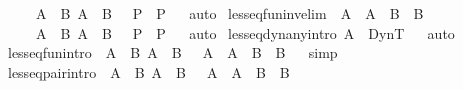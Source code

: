 \begin{isabellebody}
\ \ \ \ {\isasymlbrakk}\ A{}\ {\isasymsqsubseteq}\ B{}{\isacharsemicolon}\ A{}\ {\isasymsqsubseteq}\ B{}\ {\isasymrbrakk}\ {\isasymLongrightarrow}\ P{\isasymrbrakk}\ {\isasymLongrightarrow}\ P{\isachardoublequoteclose}\isadelimproof
\ \endisadelimproof
\isatagproof
{}\isamarkupfalse \ auto\endisatagproof
{\isafoldproof}\isadelimproof
\endisadelimproof
\isanewline
{}\isamarkupfalse \ lesseq{\isacharunderscore}fun{\isacharunderscore}inv{\isacharbrackleft}elim{\isacharbang}{\isacharbrackright}{\isacharcolon}\ {\isachardoublequoteopen}{\isasymlbrakk}\ {\isacharparenleft}A{}\ {\isasymrightarrow}\ A{}{\isacharparenright}\ {\isasymsqsubseteq}\ {\isacharparenleft}B{}\ {\isasymrightarrow}\ B{}{\isacharparenright}{\isacharsemicolon}\ \isanewline
\ \ \ \ {\isasymlbrakk}\ A{}\ {\isasymsqsubseteq}\ B{}{\isacharsemicolon}\ A{}\ {\isasymsqsubseteq}\ B{}\ {\isasymrbrakk}\ {\isasymLongrightarrow}\ P{\isasymrbrakk}\ {\isasymLongrightarrow}\ P{\isachardoublequoteclose}\isadelimproof
\ \endisadelimproof
\isatagproof
{}\isamarkupfalse \ auto\endisatagproof
{\isafoldproof}\isadelimproof
\endisadelimproof
\isanewline
\isanewline
{}\isamarkupfalse \ lesseq{\isacharunderscore}dyn{\isacharunderscore}any{\isacharbrackleft}intro{\isacharbang}{\isacharbrackright}{\isacharcolon}\ {\isachardoublequoteopen}A\ {\isasymsqsubseteq}\ DynT{\isachardoublequoteclose}\isadelimproof
\ \endisadelimproof
\isatagproof
{}\isamarkupfalse \ auto\endisatagproof
{\isafoldproof}\isadelimproof
\endisadelimproof
\isanewline
\isanewline
{}\isamarkupfalse \ less{\isacharunderscore}eq{\isacharunderscore}fun{\isacharbrackleft}intro{\isacharbang}{\isacharbrackright}{\isacharcolon}\ {\isachardoublequoteopen}{\isasymlbrakk}\ A{}\ {\isasymsqsubseteq}\ B{}{\isacharsemicolon}\ A{}\ {\isasymsqsubseteq}\ B{}\ {\isasymrbrakk}\ {\isasymLongrightarrow}\ A{}\ {\isasymrightarrow}\ A{}\ {\isasymsqsubseteq}\ B{}\ {\isasymrightarrow}\ B{}{\isachardoublequoteclose}\isadelimproof
\ \endisadelimproof
\isatagproof
{}\isamarkupfalse \ simp\endisatagproof
{\isafoldproof}\isadelimproof
\endisadelimproof
\isanewline
{}\isamarkupfalse \ less{\isacharunderscore}eq{\isacharunderscore}pair{\isacharbrackleft}intro{\isacharbang}{\isacharbrackright}{\isacharcolon}\ {\isachardoublequoteopen}{\isasymlbrakk}\ A{}\ {\isasymsqsubseteq}\ B{}{\isacharsemicolon}\ A{}\ {\isasymsqsubseteq}\ B{}\ {\isasymrbrakk}\ {\isasymLongrightarrow}\ A{}\ {\isasymtimes}\ A{}\ {\isasymsqsubseteq}\ B{}\ {\isasymtimes}\ B{}{\isachardoublequoteclose}\isadelimproof

\end{isabellebody}
